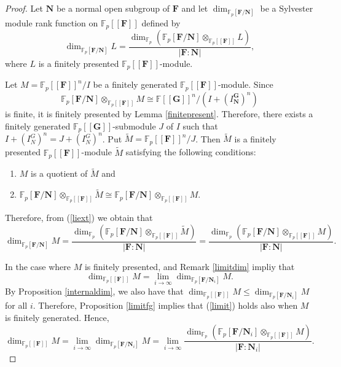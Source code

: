 \documentclass[11pt]{amsart}
\numberwithin{claimcounter}{lem}
\newcommand{\F}{\mathbb{F}}
\begin{document}
 \begin{proof} 
 Let $\mathbf N$ be a normal open subgroup of $\mathbf F$ and let $\dim_{\F_p[\mathbf F/\mathbf N]}$ be  a Sylvester module rank function on $\F_p[[\mathbf F]]$ defined by 
 $$\dim_{\F_p[\mathbf F/\mathbf N]} L=\frac{\dim_{\F_p}(\F_p[ \mathbf F/\mathbf N]\otimes_{\F_p[[\mathbf F]]}L )}{|\mathbf F:\mathbf N|},$$ where
 $L$ is a finitely presented $\F_p[[\mathbf F]]$-module.
 
Let $M=\F_p[[\mathbf F]]^n/I$ be a finitely generated  $\F_p[[\mathbf F]]$-module. Since $$ {\F_p[\mathbf F/\mathbf N]} \otimes_{\F_p[[\mathbf F]]} M\cong \F[[\mathbf G]]^n/(I+(I_{\mathbf N}^{\mathbf G})^n)$$ is finite,  it is finitely presented by Lemma \ref{finitepresent}. Therefore, there exists a finitely generated $\F_p[[\mathbf G]]$-submodule $J$ of $I$ such that $I+(I_N^G)^n=J+(I_N^G)^n$.
Put $\widetilde M=\F_p[[\mathbf F]]^n/J$. Then $\widetilde M$ is a finitely presented  $\F_p[[\mathbf F]]$-module $\widetilde M$ satisfying the following conditions: 
\begin{enumerate}
\item $M$ is a quotient of $\widetilde M$ and 
 \item ${\F_p[\mathbf F/\mathbf N]} \otimes_{\F_p[[\mathbf F]]}\widetilde M\cong   {\F_p[\mathbf F/\mathbf N]} \otimes_{\F_p[[\mathbf F]]} M.$
 \end{enumerate}
 Therefore, from (\ref{liext}) we obtain that
  $$\dim_{\F_p[\mathbf F/\mathbf N]} M=\frac{\dim_{\F_p}(\F_p[ \mathbf F/\mathbf N]\otimes_{\F_p[[\mathbf F]]}\widetilde M )}{|\mathbf F:\mathbf N|}=\frac{\dim_{\F_p}(\F_p[ \mathbf F/\mathbf N]\otimes_{\F_p[[\mathbf F]]} M )}{|\mathbf F:\mathbf N|}.$$
 
 
 In the case where $M$ is finitely presented,  \cite[Theorem 1.4]{Jataylor19} and Remark \ref{limitdim} impliy that 
 \begin{equation}\label{limit}
 \dim_{\F_p[[\mathbf F]]} M= \lim_{i\to \infty} \dim_{\F_p[\mathbf F/\mathbf N_i]} M.\end{equation}
By Proposition \ref{internaldim}, we also have that $\dim_{\F_p[[\mathbf F]]} M\le \dim_{\F_p[\mathbf F/\mathbf N_i]} M$ for all $i$. Therefore, Proposition \ref{limitfg} implies that (\ref{limit}) holds also when $M$ is finitely generated. Hence,
$$ \dim_{\F_p[[\mathbf F]]} M= \lim_{i\to \infty} \dim_{\F_p[\mathbf F/\mathbf N_i]} M=\lim_{i\to \infty} \frac{\dim_{\F_p}(\F_p[ \mathbf F/\mathbf N_i]\otimes_{\F_p[[\mathbf F]]} M )}{|\mathbf F:\mathbf N_i|}.$$
\end{proof}
\end{document}
